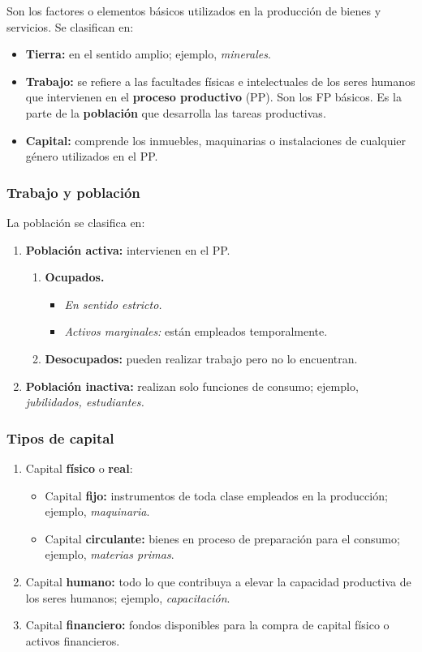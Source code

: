 \documentclass[10pt,a4paper]{article}
\begin{document}
Son los factores o elementos básicos utilizados en la producción de bienes y servicios. Se clasifican en:
\begin{itemize}
\item \textbf{Tierra:} en el sentido amplio; ejemplo, \textit{minerales}.
\item \textbf{Trabajo:} se refiere a las facultades físicas e intelectuales de los seres humanos que intervienen en el \textbf{proceso productivo} (PP). Son los FP básicos. Es la parte de la \textbf{población} que desarrolla las tareas productivas.
\item \textbf{Capital:} comprende los inmuebles, maquinarias o instalaciones de cualquier género utilizados en el PP.
\end{itemize}

\subsubsection{Trabajo y población}

La población se clasifica en:
\begin{enumerate}
\item \textbf{Población activa:} intervienen en el PP.
\begin{enumerate}
\item \textbf{Ocupados.}
\begin{itemize}
\item \textit{En sentido estricto.}
\item \textit{Activos marginales:} están empleados temporalmente.
\end{itemize}
\item \textbf{Desocupados:} pueden realizar trabajo pero no lo encuentran.
\end{enumerate}
\item \textbf{Población inactiva:} realizan solo funciones de consumo; ejemplo, \textit{jubilidados, estudiantes.}
\end{enumerate}

\subsubsection{Tipos de capital}

\begin{enumerate}
\item Capital \textbf{físico} o \textbf{real}:
\begin{itemize}
\item Capital \textbf{fijo:} instrumentos de toda clase empleados en la producción; ejemplo, \textit{maquinaria}.
\item Capital \textbf{circulante:} bienes en proceso de preparación para el consumo; ejemplo, \textit{materias primas}.
\end{itemize}
\item Capital \textbf{humano:} todo lo que contribuya a elevar la capacidad productiva de los seres humanos; ejemplo, \textit{capacitación}.
\item Capital \textbf{financiero:} fondos disponibles para la compra de capital físico o activos financieros.
\end{enumerate}
\end{document}
